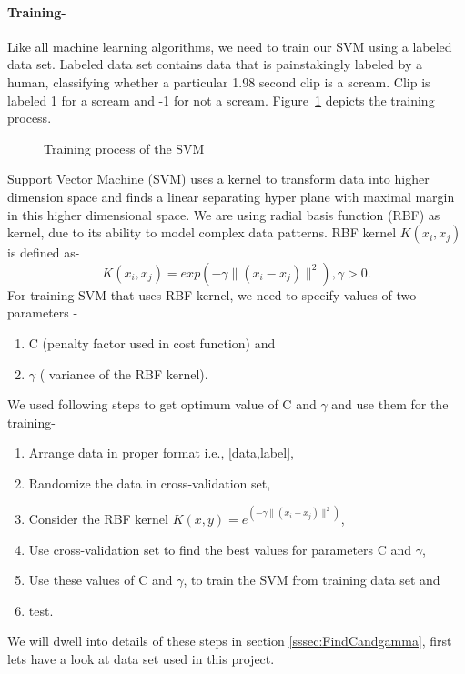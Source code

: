 \paragraph{Training-\\}

Like all machine learning algorithms, we need to train our SVM using a labeled data set. Labeled data set contains data that is painstakingly labeled by a human, classifying whether a particular 1.98 second clip is a scream. Clip is labeled 1 for a scream and -1 for not a scream. Figure~\ref{fig:train} depicts the training process.
 
\begin{figure}[H]
\centering
\def\svgwidth{\textwidth}

\caption{Training process of the SVM}
\label{fig:train}
\end{figure} 
Support Vector Machine (SVM) uses a kernel to transform data into higher dimension space and finds a linear separating hyper plane with maximal margin in this higher dimensional space. We are using radial basis function (RBF) as kernel, due to its ability to model complex data patterns. RBF kernel \(K(x_i,x_j)\)
is defined as- \[K(x_i,x_j)=exp(-\gamma\parallel(x_i-x_j)\parallel^2), \gamma>0.\]
For training SVM that uses RBF kernel, we need to specify values of two parameters -
\begin{enumerate}
 \item C (penalty factor used in cost function) and 
 \item \(\gamma\) ( variance of the RBF kernel).
\end{enumerate}
 We used following steps to get optimum value of C and \(\gamma\) and use them for the training-
\begin{enumerate}
\item Arrange data in proper format i.e., [data,label],
\item Randomize the data in cross-validation set,
\item Consider the RBF kernel \(K(x,y)=e^{(-\gamma\parallel(x_i-x_j)\parallel^2)}\),
\item Use cross-validation set to find the best values for parameters C and \(\gamma\),
\item Use these values of C and \(\gamma\), to train the SVM from training data set and
\item test.
\end{enumerate}

We will dwell into details of these steps in section \ref{sssec:FindCandgamma}, first lets have a look at data set used in this project. 

